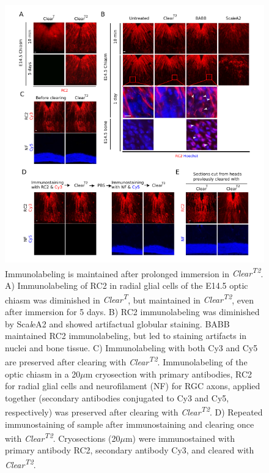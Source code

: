 \begin{figure}[hbtp]
    \begin{center}
        \includegraphics{Figures/ClearT_SFig5}
        \caption[Immunolabeling is maintained after prolonged immersion in \emph{Clear\textsuperscript{T2}}.]
        {Immunolabeling is maintained after prolonged immersion in \emph{Clear\textsuperscript{T2}}.
		A) Immunolabeling of RC2 in radial glial cells of the E14.5 optic chiasm was diminished in \emph{Clear\textsuperscript{T}}, but maintained in \emph{Clear\textsuperscript{T2}}, even after immersion for 5 days.
		B) RC2 immunolabeling was diminished by Sca\emph{l}eA2 and showed artifactual globular staining.
		BABB maintained RC2 immunolabeling, but led to staining artifacts in nuclei and bone tissue.
		C) Immunolabeling with both Cy3 and Cy5 are preserved after clearing with \emph{Clear\textsuperscript{T2}}.
		Immunolabeling of the optic chiasm in a 20$\mu$m cryosection with primary antibodies, RC2 for radial glial cells
and neurofilament (NF) for RGC axons, applied together (secondary antibodies conjugated to Cy3 and Cy5, respectively) was
preserved after clearing with \emph{Clear\textsuperscript{T2}}.
		D) Repeated immunostaining of sample after immunostaining and clearing once with \emph{Clear\textsuperscript{T2}}.
		Cryosections (20$\mu$m) were immunostained with primary antibody RC2, secondary antibody Cy3, and cleared with \emph{Clear\textsuperscript{T2}}.
}
\end{center}
\end{figure}
